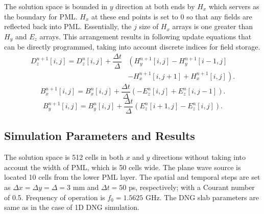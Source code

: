 The solution space is bounded in $y$ direction at both ends by $H_x$ which servers as the boundary for PML. $H_x$ at these end points is set to 0 so that any fields are reflected back into PML. Essentially, the $j$ size of $H_x$ arrays is one greater than $H_y$ and $E_z$ arrays. This arrangement results in following update equations that can be directly programmed, taking into account discrete indices for field storage.
\begin{equation}
\begin{split}
D^{n+1}_z \left[i,j\right]=D^{n}_z \left[i,j\right]+\dfrac{\Delta t}{\Delta}&\left(H^{n+1}_y\left[i,j\right]-H^{n+1}_y \left[i-1,j\right]\right.\\
&\left.-H^{n+1}_x \left[i,j+1\right]+H^{n+1}_x \left[i,j\right]\right).
\end{split}
\label{eq:Dz-2D-FDTD-TMz-Corrected}
\end{equation}
\begin{equation}
B^{n+1}_x \left[i,j\right]=B^n_x \left[i,j\right] + \dfrac{\Delta t}{\Delta} \left(-E^{n}_z \left[i,j\right] + E^{n}_z \left[i,j-1\right] \right).
\label{eq:Bx-2D-FDTD-TMz-Corrected}
\end{equation}
\begin{equation}
B^{n+1}_y \left[i,j\right]=B^n_y \left[i,j\right] + \dfrac{\Delta t}{\Delta} \left( E^{n}_z \left[i+1,j\right] - E^{n}_z \left[i,j\right] \right).
\label{eq:By-2D-FDTD-TMz-Corrected}
\end{equation}
\subsection{Simulation Parameters and Results}
The solution space is 512 cells in both $x$ and $y$ directions without taking into account the width of PML, which is 50 cells wide. The plane wave source is located 10 cells from the lower PML layer. The spatial and temporal steps are set as $\Delta x=\Delta y=\Delta=3$ mm and $\Delta t=50$ ps, respectively; with a Courant number of 0.5. Frequency of operation is $f_0=1.5625$ GHz. The DNG slab parameters are same as in the case of 1D DNG simulation.

